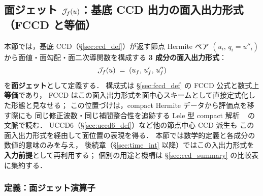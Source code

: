 %
%
\subsection{\texorpdfstring{面ジェット $\mathcal{J}_{f}\!\left(u\right)$：基底 CCD 出力の面入出力形式（FCCD と等価）}{面ジェット J\_f(u)：基底 CCD 出力の面入出力形式（FCCD と等価）}}
\label{sec:face_jet_def}

本節では，基底 CCD（§\ref{sec:ccd_def}）が返す節点 Hermite ペア
$(u_i,\,q_i = u''_i)$ から面値・面勾配・面二次導関数を構成する
\textbf{3 成分の面入出力形式}：
\[
  \mathcal{J}_{f}\!\left(u\right) \;=\; (u_f,\,u'_f,\,u''_f)
\]
を\textbf{面ジェット}として定義する．
構成式は §\ref{sec:fccd_def} の FCCD 公式と数式上\textbf{等価}であり，
FCCD はこの面入出力形式を面中心スキームとして直接定式化した形態と見なせる；
この位置づけは，compact Hermite データから評価点を移す際にも
同じ修正波数・同じ補間整合性を追跡する Lele 型 compact 解析
~\cite{Lele1992,ChuFan1998} の文脈で読む．
UCCD6（§\ref{sec:uccd6_def}）など他の節点中心 CCD 派生も
この面入出力形式を経由して面位置の表現を得る．
本節では数学的定義と各成分の数値的意味のみを与え，
後続章（§\ref{sec:time_int} 以降）ではこの入出力形式を
\textbf{入力前提}として再利用する；
個別の用途と機構は §\ref{sec:ccd_summary} の比較表に集約する．

\subsubsection{定義：面ジェット演算子}
\label{sec:face_jet_formula}

